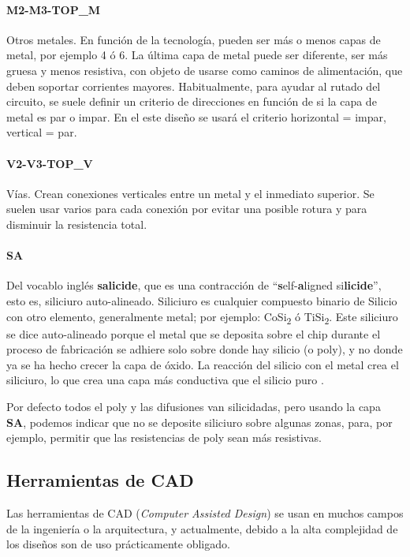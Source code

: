 \paragraph{M2-M3-TOP\_M}
Otros metales. En función de la tecnología, pueden ser
más o menos capas de metal, por ejemplo 4 ó 6. La última capa de metal puede ser
diferente, ser más gruesa y menos resistiva, con objeto de usarse como caminos de
alimentación, que deben soportar corrientes mayores. Habitualmente, para
ayudar al rutado del circuito, se suele definir un criterio de direcciones
en función de si la capa de metal es par o impar. En el este diseño se usará el criterio
horizontal = impar, vertical = par.

\paragraph{V2-V3-TOP\_V}
Vías. Crean conexiones verticales entre un metal y el
inmediato superior. Se suelen usar varios para cada conexión por evitar una
posible rotura y para disminuir la resistencia total.

\paragraph{SA}
Del vocablo inglés \textbf{salicide}, que es una contracción de ``\textbf{s}elf-\textbf{a}ligned si\textbf{licide}'',
esto es, siliciuro auto-alineado. Siliciuro es cualquier compuesto binario de
Silicio con otro elemento, generalmente metal; por ejemplo: CoSi\textsubscript{2}
ó TiSi\textsubscript{2}. Este siliciuro se dice auto-alineado porque el metal que
se deposita sobre el chip durante el proceso de fabricación se adhiere solo sobre
donde hay silicio (o poly), y no donde ya se ha hecho crecer la capa de óxido.
La reacción del silicio con el metal crea el siliciuro, lo que crea una capa más
conductiva que el silicio puro \cite{Maex:silicides}.

Por defecto todos el poly y las difusiones van silicidadas, pero usando la capa \textbf{SA},
podemos indicar que no se deposite siliciuro sobre algunas zonas, para, por ejemplo,
permitir que las resistencias de poly sean más resistivas.\\

\subsection{Herramientas de CAD}

Las herramientas de CAD (\textit{Computer Assisted Design}) se usan
en muchos campos de la ingeniería o la arquitectura, y actualmente, debido a la alta
complejidad de los diseños son de uso prácticamente obligado.\\


